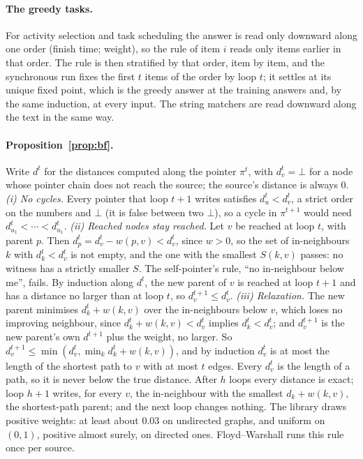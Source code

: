 \documentclass[10pt]{article}
\newcommand{\notyet}{\bot}
\begin{document}
\paragraph{The greedy tasks.} For activity selection and task scheduling the answer is read only downward along one
order (finish time; weight), so the rule of item $i$ reads only items earlier in that order. The rule is then stratified
by that order, item by item, and the synchronous run fixes the first $t$ items of the order by loop $t$; it settles at
its unique fixed point, which is the greedy answer at the training answers and, by the same induction, at every input.
The string matchers are read downward along the text in the same way.

\paragraph{Proposition~\ref{prop:bf}.} Write $d^t$ for the distances computed along the pointer $\pi^t$, with $d^t_v =
\notyet$ for a node whose pointer chain does not reach the source; the source's distance is always $0$. \emph{(i) No
cycles.} Every pointer that loop $t+1$ writes satisfies $d^t_u < d^t_v$, a strict order on the numbers and $\notyet$ (it
is false between two $\notyet$), so a cycle in $\pi^{t+1}$ would need $d^t_{u_1} < \cdots < d^t_{u_1}$. \emph{(ii)
Reached nodes stay reached.} Let $v$ be reached at loop $t$, with parent $p$. Then $d^t_p = d^t_v - w(p,v) < d^t_v$,
since $w > 0$, so the set of in-neighbours $k$ with $d^t_k < d^t_v$ is not empty, and the one with the smallest
$S(k,v)$ passes: no witness has a strictly smaller $S$. The self-pointer's rule, ``no in-neighbour below me'', fails. By
induction along $d^t$, the new parent of $v$ is reached at loop $t+1$ and has a distance no larger than at loop $t$, so
$d^{t+1}_v \leq d^{t}_v$. \emph{(iii) Relaxation.} The new parent minimises $d^t_k + w(k,v)$ over the in-neighbours
below $v$, which loses no improving neighbour, since $d^t_k + w(k,v) < d^t_v$ implies $d^t_k < d^t_v$; and $d^{t+1}_v$
is the new parent's own $d^{t+1}$ plus the weight, no larger. So $d^{t+1}_v \leq \min(d^t_v, \min_k d^t_k + w(k,v))$,
and by induction $d^t_v$ is at most the length of the shortest path to $v$ with at most $t$ edges. Every $d^t_v$ is the
length of a path, so it is never below the true distance. After $h$ loops every distance is exact; loop $h+1$ writes, for
every $v$, the in-neighbour with the smallest $d_k + w(k,v)$, the shortest-path parent; and the next loop changes
nothing. The library draws positive weights: at least about $0.03$ on undirected graphs, and uniform on $(0,1)$, positive
almost surely, on directed ones. Floyd--Warshall runs this rule once per source.
\end{document}

